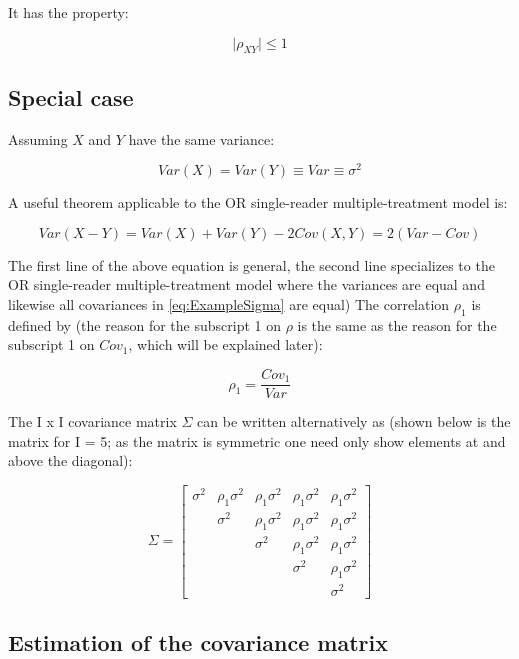 \documentclass[
]{book}
\begin{document}
It has the property:

\[\mid \rho_{XY} \mid \le 1\]

\hypertarget{special-case}{%
\subsection{Special case}\label{special-case}}

Assuming \(X\) and \(Y\) have the same variance:

\[Var(X)=Var(Y)\equiv Var\equiv \sigma^2\]

A useful theorem applicable to the OR single-reader multiple-treatment model is:

\begin{equation}
Var(X-Y)=Var(X)+Var(Y)-2Cov(X,Y)=2(Var-Cov)
\label{eq:UsefulTheorem}
\end{equation}

The first line of the above equation is general, the second line specializes to the OR single-reader multiple-treatment model where the variances are equal and likewise all covariances in \eqref{eq:ExampleSigma} are equal) The correlation \(\rho_1\) is defined by (the reason for the subscript 1 on \(\rho\) is the same as the reason for the subscript 1 on \(Cov_1\), which will be explained later):

\[\rho_1=\frac{Cov_1}{Var}\]

The I x I covariance matrix \(\Sigma\) can be written alternatively as (shown below is the matrix for I = 5; as the matrix is symmetric one need only show elements at and above the diagonal):

\begin{equation}
\Sigma = 
\begin{bmatrix}
\sigma^2 & \rho_1\sigma^2 & \rho_1\sigma^2 & \rho_1\sigma^2 & \rho_1\sigma^2\\
& \sigma^2 & \rho_1\sigma^2 & \rho_1\sigma^2 & \rho_1\sigma^2\\
&  & \sigma^2 & \rho_1\sigma^2 & \rho_1\sigma^2\\
&  &  & \sigma^2 & \rho_1\sigma^2\\
&  &  &  & \sigma^2
\end{bmatrix}
\label{eq:ExampleSigmaRho}
\end{equation}

\hypertarget{estimation-of-the-covariance-matrix}{%
\subsection{Estimation of the covariance matrix}\label{estimation-of-the-covariance-matrix}}
\end{document}
